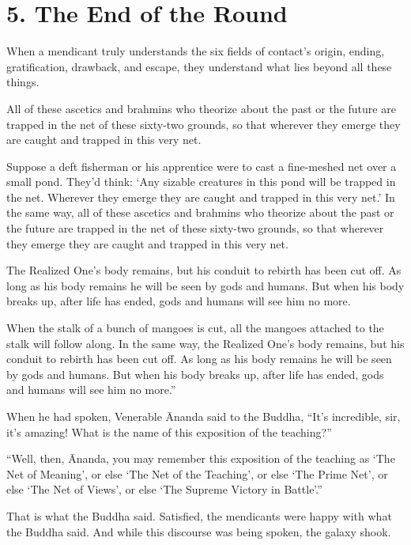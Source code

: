 \documentclass[12pt,openany]{book}%
\begin{document}
\section*{5. The End of the Round }

When a mendicant truly understands the six fields of contact’s origin, ending, gratification, drawback, and escape, they understand what lies beyond all these things. 

All of these ascetics and brahmins who theorize about the past or the future are trapped in the net of these sixty-two grounds, so that wherever they emerge they are caught and trapped in this very net. 

Suppose a deft fisherman or his apprentice were to cast a fine-meshed net over a small pond. They’d think: ‘Any sizable creatures in this pond will be trapped in the net. Wherever they emerge they are caught and trapped in this very net.’ In the same way, all of these ascetics and brahmins who theorize about the past or the future are trapped in the net of these sixty-two grounds, so that wherever they emerge they are caught and trapped in this very net. 

The Realized One’s body remains, but his conduit to rebirth has been cut off. As long as his body remains he will be seen by gods and humans. But when his body breaks up, after life has ended, gods and humans will see him no more. 

When the stalk of a bunch of mangoes is cut, all the mangoes attached to the stalk will follow along. In the same way, the Realized One’s body remains, but his conduit to rebirth has been cut off. As long as his body remains he will be seen by gods and humans. But when his body breaks up, after life has ended, gods and humans will see him no more.” 

When he had spoken, Venerable Ānanda said to the Buddha, “It’s incredible, sir, it’s amazing! What is the name of this exposition of the teaching?” 

“Well, then, Ānanda, you may remember this exposition of the teaching as ‘The Net of Meaning’, or else ‘The Net of the Teaching’, or else ‘The Prime Net’, or else ‘The Net of Views’, or else ‘The Supreme Victory in Battle’.” 

That is what the Buddha said. Satisfied, the mendicants were happy with what the Buddha said. And while this discourse was being spoken, the galaxy shook. 
\end{document}
